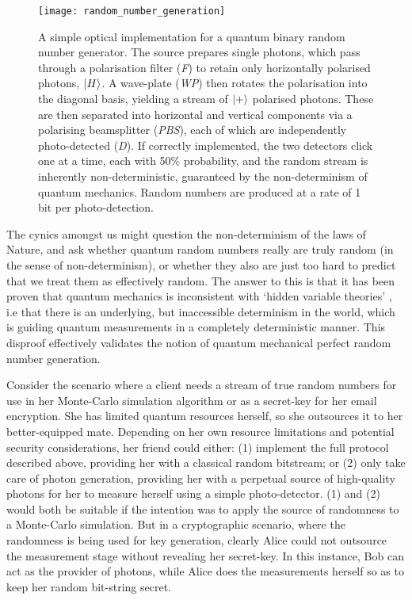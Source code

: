 \begin{figure}[!htpb]
	\texttt{[image: random\_number\_generation]}
	\caption{A simple optical implementation for a quantum binary random number generator. The source prepares single photons, which pass through a polarisation filter (\textit{F}) to retain only horizontally polarised photons, $|H\rangle$. A wave-plate (\textit{WP}) then rotates the polarisation into the diagonal basis, yielding a stream of $|+\rangle$ polarised photons. These are then separated into horizontal and vertical components via a polarising beamsplitter (\textit{PBS}), each of which are independently photo-detected (\textit{D}). If correctly implemented, the two detectors click one at a time, each with 50\% probability, and the random stream is inherently non-deterministic, guaranteed by the non-determinism of quantum mechanics. Random numbers are produced at a rate of 1 bit per photo-detection.}\label{fig:random_number_generation}
\end{figure}

The cynics amongst us might question the non-determinism of the laws of Nature, and ask whether quantum random numbers really are truly random (in the sense of non-determinism), or whether they also are just too hard to predict that we treat them as effectively random. The answer to this is that it has been proven that quantum mechanics is inconsistent with `hidden variable theories' \cite{Bell}, i.e that there is an underlying, but inaccessible determinism in the world, which is guiding quantum measurements in a completely deterministic manner. This disproof effectively validates the notion of quantum mechanical perfect random number generation.

Consider the scenario where a client needs a stream of true random numbers for use in her Monte-Carlo simulation algorithm or as a secret-key for her email encryption. She has limited quantum resources herself, so she outsources it to her better-equipped mate. Depending on her own resource limitations and potential security considerations, her friend could either: (1) implement the full protocol described above, providing her with a classical random bitstream; or (2) only take care of photon generation, providing her with a perpetual source of high-quality photons for her to measure herself using a simple photo-detector. (1) and (2) would both be suitable if the intention was to apply the source of randomness to a Monte-Carlo simulation. But in a cryptographic scenario, where the randomness is being used for key generation, clearly Alice could not outsource the measurement stage without revealing her secret-key. In this instance, Bob can act as the provider of photons, while Alice does the measurements herself so as to keep her random bit-string secret.

